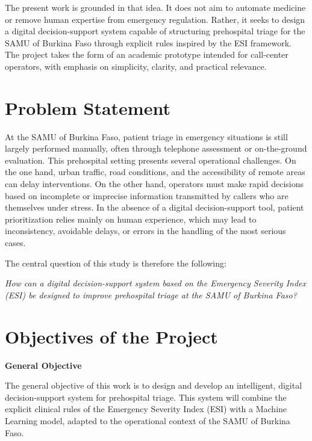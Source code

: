\documentclass[a4paper,12pt,oneside]{report}
\begin{document}
The present work is grounded in that idea. It does not aim to automate medicine or remove human expertise from emergency regulation. Rather, it seeks to design a digital decision-support system capable of structuring prehospital triage for the SAMU of Burkina Faso through explicit rules inspired by the ESI framework. The project takes the form of an academic prototype intended for call-center operators, with emphasis on simplicity, clarity, and practical relevance.

\section*{Problem Statement}

At the SAMU of Burkina Faso, patient triage in emergency situations is still largely performed manually, often through telephone assessment or on-the-ground evaluation. This prehospital setting presents several operational challenges. On the one hand, urban traffic, road conditions, and the accessibility of remote areas can delay interventions. On the other hand, operators must make rapid decisions based on incomplete or imprecise information transmitted by callers who are themselves under stress. In the absence of a digital decision-support tool, patient prioritization relies mainly on human experience, which may lead to inconsistency, avoidable delays, or errors in the handling of the most serious cases.

The central question of this study is therefore the following:

\textit{How can a digital decision-support system based on the Emergency Severity Index (ESI) be designed to improve prehospital triage at the SAMU of Burkina Faso?}

\section*{Objectives of the Project}

\textbf{General Objective}

The general objective of this work is to design and develop an intelligent, digital decision-support system for prehospital triage. This system will combine the explicit clinical rules of the Emergency Severity Index (ESI) with a Machine Learning model, adapted to the operational context of the SAMU of Burkina Faso.
\end{document}
